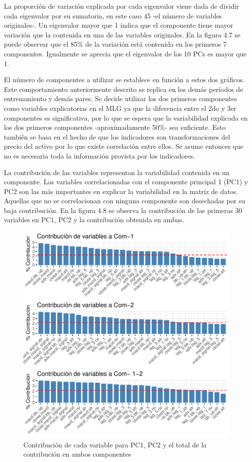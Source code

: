 \documentclass[a4paper,12pt]{Latex/Classes/PhDthesisPSnPDF}
\begin{document}
La proporción de variación explicada por cada eigenvalor viene dada de dividir cada eigenvalor por su sumatoria, en este caso 45 -el número de variables originales-. Un eigenvalor mayor que 1 indica que el componente tiene mayor variación que la contenida en una de las variables originales. En la figura 4.7 se puede observar que el 85\% de la variación está contenida en los primeros 7 componentes. Igualmente se aprecia que el eigenvalor de los 10 PCs es mayor que 1. 

El número de componentes a utilizar se establece en función a estos dos gráficos. Este comportamiento anteriormente descrito se replica en los demás períodos de entrenamiento y demás pares. Se decide utilizar los dos primeros componentes como variables explicatorias en el MLG ya que la diferencia entre el 2do y 3er componentes es significativa, por lo que se espera que la variabilidad explicada en los dos primeros componentes -aproximadamente 50\%- sea suficiente. Esto también se basa en el hecho de que los indicadores son transformaciones del precio del activo por lo que existe correlación entre ellos. Se asume entonces que no es necesaria toda la información provista por los indicadores.


La contribución de las variables representan la variabilidad contenida en un componente. Las variables correlacionadas con el componente principal 1 (PC1) y PC2 son las más importantes en explicar la variabilidad en la matriz de datos. Aquellas que no se correlacionan con ninguna componente son desechadas por su baja contribución. En la figura 4.8 se observa la contribución de las primeras 30 variables en PC1, PC2 y la contribución obtenida en ambas.

\begin{figure}[H]
\centering
\includegraphics{main-014}
\caption{Contribución de cada variable para PC1, PC2 y el total de la contribución en ambos componentes}
\end{figure}
\end{document}
